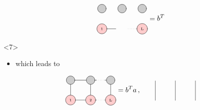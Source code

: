 \documentclass[aspectratio=169]{beamer}
\begin{document}
\begin{frame}
\begin{onlyenv}
\begin{equation}
\begin{tikzpicture}[baseline={([yshift=-.5ex]current bounding box.center)}]
        \draw[gray, thick] (0,-1) -- (0.7,-1);
        \draw[gray, dotted] (1.3,-1) -- (1.7,-1);
        \draw[gray, thick] (1.7,-1) -- (2.0,-1);
    
        \node[draw, circle, line cap=round, fill=black!20, minimum size=12] at (0,0) {  };
        \node[draw, circle, line cap=round, fill=black!20, minimum size=12] at (1,0) {  };
        \node[draw, circle, line cap=round, fill=black!20, minimum size=12] at (2,0) {  };
    
        \node[draw, circle, line cap=round, fill=red!20] at (0,-1) {\tiny 1};
        \node[draw, circle, line cap=round, fill=red!20] at (2,-1) {\tiny L};
      \end{tikzpicture} = b^T
    \end{equation}
  \end{onlyenv}
  \begin{onlyenv}<7>
    \begin{itemize}
      \item which leads to
    \end{itemize}
    \begin{equation}
      \begin{tikzpicture}[baseline={([yshift=-.5ex]current bounding box.center)}]
        \draw[gray, thick] (0,0) -- (0,-1);
        \draw[gray, thick] (1,0) -- (1,-1);
        \draw[gray, thick] (2,0) -- (2,-1);
    
        \draw[gray, thick] (0,0) -- (1.3,0);
        \draw[gray, dotted] (1.3,0) -- (1.7,0);
        \draw[gray, thick] (1.7,0) -- (2.0,0);
    
        \draw[gray, thick] (0,-1) -- (1.3,-1);
        \draw[gray, dotted] (1.3,-1) -- (1.7,-1);
        \draw[gray, thick] (1.7,-1) -- (2.0,-1);
    
        \node[draw, circle, line cap=round, fill=black!20, minimum size=12] at (0,0) {  };
        \node[draw, circle, line cap=round, fill=black!20, minimum size=12] at (1,0) {  };
        \node[draw, circle, line cap=round, fill=black!20, minimum size=12] at (2,0) {  };
    
        \node[draw, circle, line cap=round, fill=red!20] at (0,-1) {\tiny 1};
        \node[draw, circle, line cap=round, fill=red!20] at (1,-1) {\tiny 2};
        \node[draw, circle, line cap=round, fill=red!20] at (2,-1) {\tiny L};
      \end{tikzpicture} = b^T a \thinspace , \qquad
      \begin{tikzpicture}[baseline={([yshift=-.5ex]current bounding box.center)}]
        \draw[gray, thick] (0,0) -- (0,-1);
        \draw[gray, thick] (1,0) -- (1,-1);
        \draw[gray, thick] (2,0) -- (2,-1);
      

\end{tikzpicture}
\end{equation}
\end{onlyenv}
\end{frame}
\end{document}
